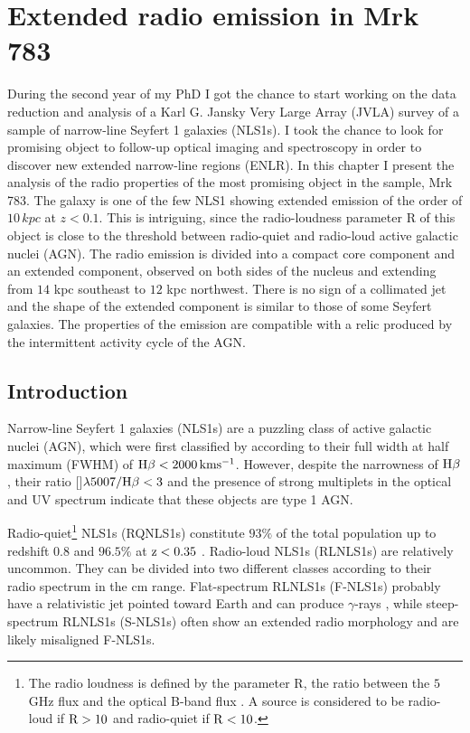 \documentclass[../thesis.tex]{subfiles}
\begin{document}
\chapter[Extended radio emission in Mrk 783]{Extended radio emission in Mrk 783}
\label{cap:paper2}

During the second year of my PhD I got the chance to start working on the data reduction and analysis of a Karl G. Jansky Very Large Array (JVLA) survey of a sample of narrow-line Seyfert 1 galaxies (NLS1s).
I took the chance to look for promising object to follow-up optical imaging and spectroscopy in order to discover new extended narrow-line regions (ENLR).
In this chapter I present the analysis of the radio properties of the most promising object in the sample, Mrk 783.
The galaxy is one of the few NLS1 showing extended emission of the order of $10\,\si{kpc}$ at $z<0.1$.
This is intriguing, since the radio-loudness parameter R of this object is close to the threshold between radio-quiet and radio-loud active galactic nuclei (AGN).
The radio emission is divided into a compact core component and an extended component, observed on both sides of the nucleus and extending from $14$ kpc southeast to $12$ kpc northwest.
There is no sign of a collimated jet and the shape of the extended component is similar to those of some Seyfert galaxies.
The properties of the emission are compatible with a relic produced by the intermittent activity cycle of the AGN.

\section{Introduction}
Narrow-line Seyfert 1 galaxies (NLS1s) are a puzzling class of active galactic nuclei (AGN), which were first classified by \citet{Osterbrock85} according to their full width at half maximum (FWHM) of $\rm H\beta < 2000\,km s^{-1}$. 
However, despite the narrowness of $\rm H\beta$, their ratio []$\lambda5007/\rm H\beta< 3$ and the presence of strong  multiplets in the optical and UV spectrum indicate that these objects are type 1 AGN. 

Radio-quiet\footnote{The radio loudness is defined by the parameter R, the ratio between the $5$ GHz flux and the optical B-band flux \citep{Kellermann89}. A source is considered to be radio-loud if $\rm R>10$ and radio-quiet if $\rm R <10$.} NLS1s (RQNLS1s) constitute $93\%$ of the total population up to redshift $0.8$ \citep{Komossa06} and $96.5\%$ at $\rm z<0.35$ \citep{Cracco16}.
Radio-loud NLS1s (RLNLS1s) are relatively uncommon.
They can be divided into two different classes according to their radio spectrum in the cm range.
Flat-spectrum RLNLS1s (F-NLS1s) probably have a relativistic jet pointed toward Earth and can produce $\gamma$-rays \citep{Abdo09a, Abdo09b}, while steep-spectrum RLNLS1s (S-NLS1s) often show an extended radio morphology and are likely misaligned F-NLS1s. 
\end{document}
